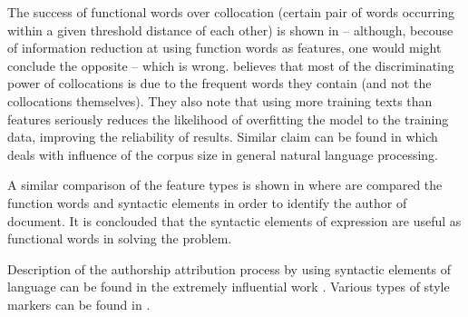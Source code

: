 \documentclass[11pt,english]{article}
\newcommand{\engl}[1]{(engl.~\emph{#1})}
\begin{document}
\begin{multicols}{2}
The success of functional words over collocation (certain pair of words occurring
within a given threshold distance of each other) is shown in
\citep{argamon2005measuring} -- although, becouse of information reduction at
using function words as features, one would might conclude the opposite -- which
is wrong. \citet{argamon2005measuring} believes that most of the discriminating
power of collocations is due to the frequent words they contain (and not the
collocations themselves). They also note that using more training texts than
features seriously reduces the likelihood of overfitting the model to the
training data, improving the reliability of results. Similar claim can be found
in \citep{banko2001scaling} which deals with influence of the corpus size in
general natural language processing.

A similar comparison of the feature types is shown in
\citep{uzuner2005comparative} where are compared the function words and syntactic
elements in order to identify the author of document. It is conclouded that the
syntactic elements of expression are useful as functional words in solving the
problem.

Description of the authorship attribution process by using syntactic elements
of language can be found in the extremely influential work
\citep{stamatatos2001computer}. Various types of style markers can be found in
\citep{diri2003automatic,luyckx2005shallow}.


\end{multicols}
\end{document}

